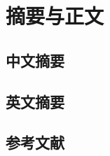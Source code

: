 \documentclass[twoside]{Style/ucasthesis}%
\begin{document}
\mainmatter
\chapter{}
\chapter{}
\chapter{摘要与正文}

\section{中文摘要}


\section{英文摘要}


{%
    \let\chapter\section
    \let\section\subsection
    \let\subsection\subsubsection
    \let\subsubsection\paragraph
}

\section{参考文献}
\end{document}
